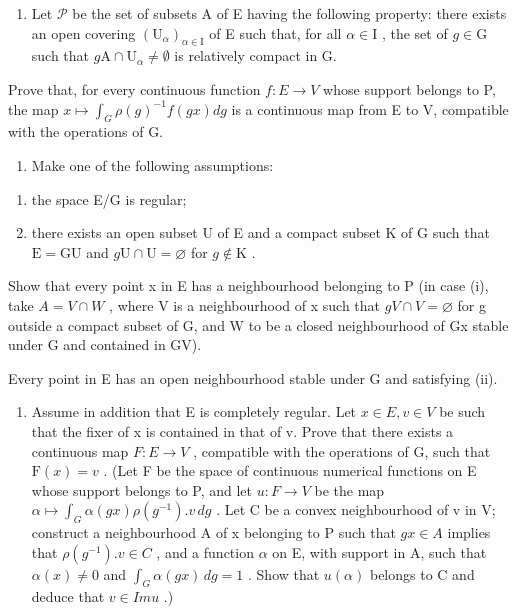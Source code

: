 \begin{enumerate}
\def\labelenumi{\alph{enumi})}
\tightlist
\item
  Let \(\mathcal{P}\) be the set of subsets A of E having the following property: there exists an open covering \((\mathrm{U}_{\alpha})_{\alpha \in \mathrm{I}}\) of E such that, for all \(\alpha \in \mathrm{I}\) , the set of \(g \in \mathrm{G}\) such that \(g\mathrm{A} \cap \mathrm{U}_{\alpha} \neq \emptyset\) is relatively compact in G.
\end{enumerate}

Prove that, for every continuous function \(f: E \to V\) whose support belongs to P, the map \(x \mapsto \int_{G} \rho(g)^{-1} f(gx) dg\) is a continuous map from E to V, compatible with the operations of G.

\begin{enumerate}
\def\labelenumi{\alph{enumi})}
\setcounter{enumi}{1}
\tightlist
\item
  Make one of the following assumptions:
\end{enumerate}

\begin{enumerate}
\def\labelenumi{(\roman{enumi})}
\item
  the space E/G is regular;
\item
  there exists an open subset U of E and a compact subset K of G such that \(\mathrm{E} = \mathrm{GU}\) and \(g\mathrm{U}\cap \mathrm{U} = \varnothing\) for \(g\notin \mathrm{K}\) .
\end{enumerate}

Show that every point x in E has a neighbourhood belonging to P (in case (i), take \(A = V \cap W\) , where V is a neighbourhood of x such that \(gV \cap V = \varnothing\) for g outside a compact subset of G, and W to be a closed neighbourhood of Gx stable under G and contained in GV).

Every point in E has an open neighbourhood stable under G and satisfying (ii).

\begin{enumerate}
\def\labelenumi{\alph{enumi})}
\setcounter{enumi}{2}
\tightlist
\item
  Assume in addition that E is completely regular. Let \(x \in E, v \in V\) be such that the fixer of x is contained in that of v. Prove that there exists a continuous map \(F : E \to V\) , compatible with the operations of G, such that \(\mathrm{F}(x) = v\) . (Let F be the space of continuous numerical functions on E whose support belongs to P, and let \(u : F \to V\) be the map \(\alpha \mapsto \int_{G} \alpha(gx) \rho(g^{-1}). v \, dg\) . Let C be a convex neighbourhood of v in V; construct a neighbourhood A of x belonging to P such that \(gx \in A\) implies that \(\rho(g^{-1}). v \in C\) , and a function \(\alpha\) on E, with support in A, such that \(\alpha(x) \neq 0\) and \(\int_{G} \alpha(gx) \, dg = 1\) . Show that \(u(\alpha)\) belongs to C and deduce that \(v \in Im u\) .)
\end{enumerate}

